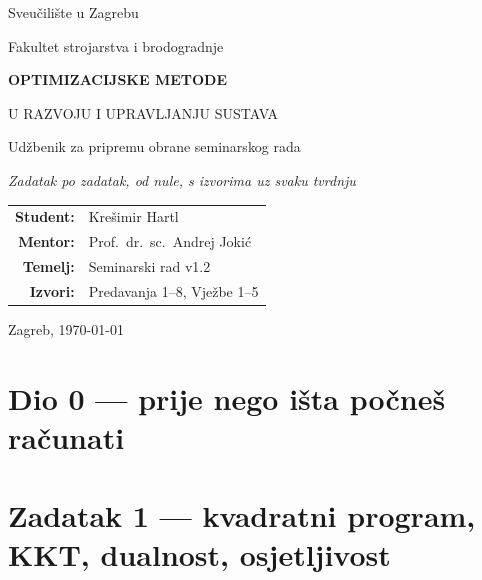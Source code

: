 \documentclass[11pt,a4paper,oneside]{report}
\begin{document}
\begin{titlepage}
\centering
\vspace*{1.5cm}
{\large Sveučilište u Zagrebu\par\smallskip Fakultet strojarstva i brodogradnje\par}
\vspace{2.5cm}
{\Huge\bfseries\color{fsbplava} OPTIMIZACIJSKE METODE\par\vspace{0.3cm}
 U RAZVOJU I UPRAVLJANJU SUSTAVA\par}
\vspace{1.2cm}
{\LARGE Udžbenik za pripremu obrane seminarskog rada\par}
\vspace{0.6cm}
{\large\itshape Zadatak po zadatak, od nule, s izvorima uz svaku tvrdnju\par}
\vspace{2.5cm}
\begin{tabular}{rl}
\textbf{Student:} & Krešimir Hartl \\[4pt]
\textbf{Mentor:} & Prof.\ dr.\ sc.\ Andrej Jokić \\[4pt]
\textbf{Temelj:} & Seminarski rad v1.2 \\[4pt]
\textbf{Izvori:} & Predavanja 1--8, Vježbe 1--5 \\
\end{tabular}
\vfill
{\large Zagreb, \today\par}
\end{titlepage}

\tableofcontents
\clearpage
{}

\part*{Dio 0 — prije nego išta počneš računati}





\part*{Zadatak 1 — kvadratni program, KKT, dualnost, osjetljivost}









\end{document}
